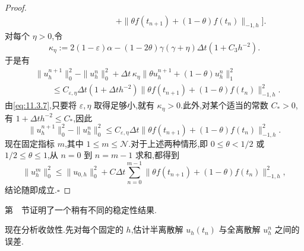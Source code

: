 \begin{proof}
\begin{equation}
\begin{aligned}
      &\hspace{8em}+\|\theta f(t_{n+1})+(1-\theta)f(t_n)\|_{-1,h}\bigr].
  \end{aligned}
\end{equation}
对每个 \(\eta>0\),令
\[
  \kappa_\eta:=2(1-\varepsilon)\alpha-
       (1-2\theta)\gamma(\gamma+\eta)\Delta t(1+C_3h^{-2}).
\]
于是有
\[
  \begin{aligned}
    &\|u_h^{n+1}\|_0^2-\|u_h^n\|_0^2+
             \Delta t\,\kappa_\eta\|\theta u_h^{n+1}+(1-\theta)u_h^n\|_1^2\\
    &\qquad\le C_{\varepsilon,\eta}\Delta t(1+\Delta t h^{-2})
                \|\theta f(t_{n+1})+(1-\theta)f(t_n)\|_{-1,h}^2 .
  \end{aligned}
\]
由\eqref{eq:11.3.7},只要将 \(\varepsilon,\eta\) 取得足够小,就有 \(\kappa_\eta>0\).此外,对某个适当的常数 \(C_*>0\),有 \(1+\Delta t h^{-2}\le C_*\),因此
\begin{equation}\label{eq:11.3.12}
  \|u_h^{n+1}\|_0^2-\|u_h^n\|_0^2
     \le C_{\varepsilon,\eta}\Delta t
              \|\theta f(t_{n+1})+(1-\theta)f(t_n)\|_{-1,h}^2.
\end{equation}
现在固定指标 \(m\),其中 \(1\le m\le\mathcal N\).对于上述两种情形,即 \(0\le\theta<1/2\) 或 \(1/2\le\theta\le1\),从 \(n=0\) 到 \(n=m-1\) 求和,都得到
\[
  \|u_h^m\|_0^2\le\|u_{0,h}\|_0^2+
        C\Delta t\sum_{n=0}^{m-1}
           \|\theta f(t_{n+1})+(1-\theta)f(t_n)\|_{-1,h}^2,
\]
结论随即成立.\hfill\(\square\)
\end{proof}

第~~节证明了一个稍有不同的稳定性结果.

现在分析收敛性.先对每个固定的 \(h\),估计半离散解 \(u_h(t_n)\) 与全离散解 \(u_h^n\) 之间的误差.

